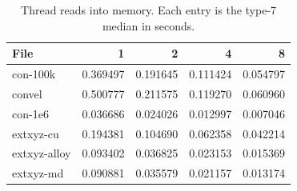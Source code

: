 \begin{table}[tbp]
\centering
\footnotesize
\caption{Thread reads into memory. Each entry is the type-7 median in seconds.}
\label{tab:r6-read}
\begin{tabular}{@{}lrrrr@{}}
\toprule
File & 1 & 2 & 4 & 8 \\
\midrule
con-100k & 0.369497 & 0.191645 & 0.111424 & 0.054797 \\
convel & 0.500777 & 0.211575 & 0.119270 & 0.060960 \\
con-1e6 & 0.036686 & 0.024026 & 0.012997 & 0.007046 \\
extxyz-cu & 0.194381 & 0.104690 & 0.062358 & 0.042214 \\
extxyz-alloy & 0.093402 & 0.036825 & 0.023153 & 0.015369 \\
extxyz-md & 0.090881 & 0.035579 & 0.021157 & 0.013174 \\
\bottomrule
\end{tabular}
\end{table}
